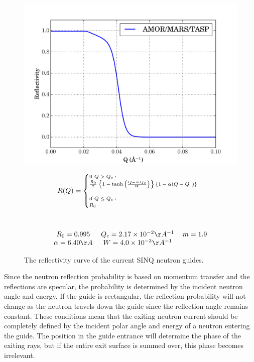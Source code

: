\documentclass[a4paper]{jpconf}
\begin{document}
\begin{figure}[h]
\begin{minipage}{14pc}
\includegraphics[scale=.4]{graphics/refl.pdf}
\caption{\label{SINQ_reflectivity} The reflectivity curve of the current SINQ neutron guides.}
\end{minipage}\hspace{5pc}%
\begin{minipage}{11pc}
\begin{multline}\label{eq:ref}\scriptsize
R(Q) = 
\begin{cases}
    \mbox{if } Q > Q_c : \\
    \frac{R_0}{2}\left\{  1 - \tanh\left(  \frac{Q - m Q_c}{W}\right) \right\}\{1-\alpha(Q-Q_c)\} \\
    \\
    \mbox{if } Q \leq Q_c :\\
    R_0 \\
\end{cases} \\ \\ \\
\begin{tabular}{c c c}
$R_0=0.995$ & $Q_c=2.17\times10^{-2}\AA^{-1}$ & $m=1.9$ \\ 
$\alpha=6.40 \AA$ & $W=4.0\times10^{-3} \AA^{-1}$ 
\end{tabular} \\
\end{multline}
\end{minipage} 
\end{figure}

Since the neutron reflection probability is based on momentum transfer and the reflections are specular, the probability is determined by the incident neutron angle and energy.  If the guide is rectangular, the reflection probability will not change as the neutron travels down the guide since the reflection angle remains constant.  These conditions mean that the exiting neutron current should be completely defined by the incident polar angle and energy of a neutron entering the guide.  The position in the guide entrance will determine the phase of the exiting rays, but if the entire exit surface is summed over, this phase becomes irrelevant.
\end{document}
